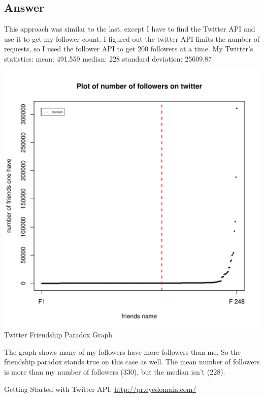 \documentclass[letterpaper,12pt]{article}
\begin{document}
\subsection{Answer}
This approach was similar to the last, except I have to find the Twitter API and use it to get my follower count. I figured out the twitter API limits the number of requests, so I used the follower API to get 200 followers at a time. 
\vspace{1mm}
My Twitter's statistics:
mean: 491.559
median: 228
standard deviation: 25609.87
\vspace{2mm}

\vspace{2mm}
        \includegraphics[scale=0.35]{twitterplotter.pdf}\\
        \caption{Twitter Friendship Paradox Graph}
        \label{Twitter Friendship Paradox Graph}
The graph shows many of my followers have more followers than me. So the friendship paradox stands true on this case as well. The mean number of followers is  more than my number of followers (330), but the median isn't (228).

\vspace{2mm}
\vspace*{5pt}

\vspace{2mm}
\vspace{5mm}
\vspace{5mm}

\newpage
\newline
\newpage
\vspace*{5pt}

\begin{thebibliography}{9}
\bibitem{} Getting Started with Twitter API: \url{http://pr.eyedomain.com/}
\end{thebibliography}
\end{document}
